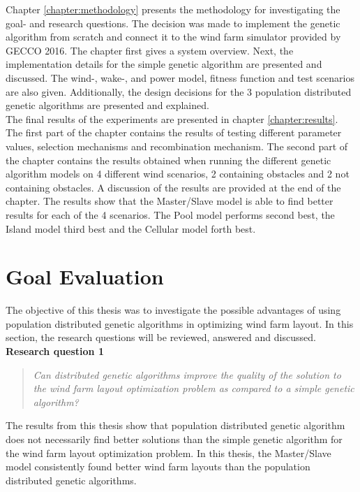 \noindent Chapter \ref{chapter:methodology} presents the methodology for investigating the goal- and research questions. The decision was made to implement the genetic algorithm from scratch and connect it to the wind farm simulator provided by GECCO 2016. The chapter first gives a system overview. Next, the implementation details for the simple genetic algorithm are presented and discussed. The wind-, wake-, and power model, fitness function and test scenarios are also given. Additionally, the design decisions for the 3 population distributed genetic algorithms are presented and explained.\\


\noindent The final results of the experiments are presented in chapter \ref{chapter:results}. The first part of the chapter contains the results of testing different parameter values, selection mechanisms and recombination mechanism. The second part of the chapter contains the results obtained when running the different genetic algorithm models on 4 different wind scenarios, 2 containing obstacles and 2 not containing obstacles. A discussion of the results are provided at the end of the chapter. The results show that the Master/Slave model is able to find better results for each of the 4 scenarios. The Pool model performs second best, the Island model third best and the Cellular model forth best.\\


\section{Goal Evaluation}\label{section:goal evaluation}
\noindent The objective of this thesis was to investigate the possible advantages of using population distributed genetic algorithms in optimizing wind farm layout. In this section, the research questions will be reviewed, answered and discussed.\\

\noindent \textbf{Research question 1}

\begin{quote}
\textit{Can distributed genetic algorithms improve the quality of the solution to the wind farm layout optimization problem as compared to a simple genetic algorithm?}
\end{quote}

\noindent The results from this thesis show that population distributed genetic algorithm does not necessarily find better solutions than the simple genetic algorithm for the wind farm layout optimization problem. In this thesis, the Master/Slave model consistently found better wind farm layouts than the population distributed genetic algorithms. \\

